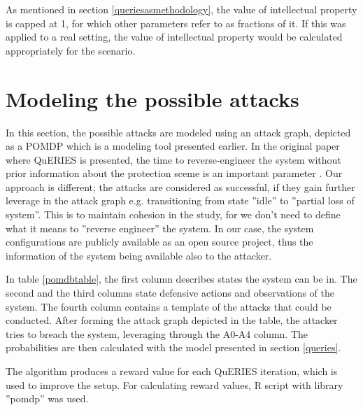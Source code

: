 As mentioned in section \ref{queriesasmethodology}, the
value of intellectual property is capped at 1, for which other
parameters refer to as fractions of it. If this was applied to a real
setting, the value of intellectual property would be calculated
appropriately for the scenario.

\section{Modeling the possible attacks}

In this section, the possible attacks are modeled using an attack
graph, depicted as a POMDP which is a modeling tool presented
earlier. In the original paper where QuERIES is presented, the time to
reverse-engineer the system without prior information about the
protection sceme is an important parameter
\cite{carin2008cybersecurity}. Our approach is different; the attacks
are considered as successful, if they gain further leverage in the
attack graph e.g. transitioning from state ''idle'' to ''partial loss of
system''. This is to maintain cohesion in the study, for we don't need
to define what it means to ''reverse engineer'' the system. In our
case, the system configurations are publicly available as an open source
project, thus the information of the system being available also to
the attacker.

In table \ref{pomdbtable}, the first column describes states the
system can be in. The second and the third columns state defensive
actions and observations of the system. The fourth column contains a
template of the attacks that could be conducted. After forming the
attack graph depicted in the table, the attacker tries to breach the
system, leveraging through the A0-A4 column. The probabilities are
then calculated with the model presented in section \ref{queries}.

The algorithm produces a reward value for each QuERIES iteration,
which is used to improve the setup. For calculating reward values, R
script with library ''pomdp'' was used.

